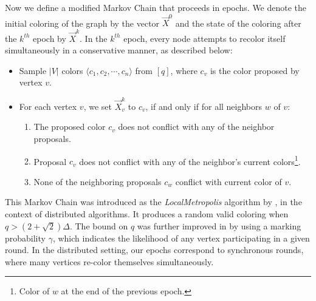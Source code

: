 Now we define a modified Markov Chain that proceeds in epochs.
We denote the initial coloring of the graph by the vector $\vec X^0$ and the state of the coloring after the $k^{th}$ epoch by $\vec X^k$.
In the $k^{th}$ epoch, every node attempts to recolor itself simultaneously in a conservative manner, as described below:
\begin{itemize}
    \item Sample $|V|$ colors $ \langle c_1, c_2,\cdots, c_n \rangle$ from $[q]$, where $c_v$ is the color proposed by vertex $v$.
    \item For each vertex $v$, we set $\vec X^k_v$ to $c_v$, if and only if for all neighbors $w$ of $v$:
    \begin{enumerate}
        \item {}
        The proposed color $c_v$ does not conflict with any of the neighbor proposals.
        \item {}
        Proposal $c_v$ does not conflict with any of the neighbor's current colors\footnote{Color of $w$ at the end of the previous epoch.}.
        \item {}
        None of the neighboring proposals $c_w$ conflict with current color of $v$.
    \end{enumerate}
\end{itemize}
This Markov Chain was introduced as the \emph{LocalMetropolis} algorithm by \cite{what_local}, in the context of distributed algorithms.
It produces a random valid coloring when $q > (2+\sqrt 2)\Delta$.
The bound on $q$ was further improved in \cite{yitong, ghaffari_fischer} by using a marking probability $\gamma$,
which indicates the likelihood of any vertex participating in a given round.
In the distributed setting, our epochs correspond to synchronous rounds, where many vertices re-color themselves simultaneously.

